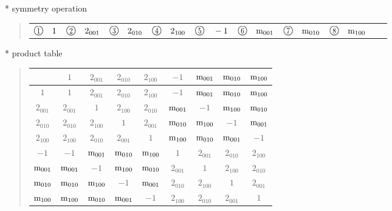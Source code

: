 \documentclass[fleqn,10pt,landscape]{jsarticle}
\begin{document}
* symmetry operation
\begin{quote}
\begin{tabular}{llllllllll}
$ {\ooalign{\hfil\resizebox{.8\width}{\height}{1}\hfil\crcr\raise.1ex\hbox{\large$\bigcirc$}}}\quad 1 $ & $ {\ooalign{\hfil\resizebox{.8\width}{\height}{2}\hfil\crcr\raise.1ex\hbox{\large$\bigcirc$}}}\quad 2{}_{001} $ & $ {\ooalign{\hfil\resizebox{.8\width}{\height}{3}\hfil\crcr\raise.1ex\hbox{\large$\bigcirc$}}}\quad 2{}_{010} $ & $ {\ooalign{\hfil\resizebox{.8\width}{\height}{4}\hfil\crcr\raise.1ex\hbox{\large$\bigcirc$}}}\quad 2{}_{100} $ & $ {\ooalign{\hfil\resizebox{.8\width}{\height}{5}\hfil\crcr\raise.1ex\hbox{\large$\bigcirc$}}}\quad -1 $ & $ {\ooalign{\hfil\resizebox{.8\width}{\height}{6}\hfil\crcr\raise.1ex\hbox{\large$\bigcirc$}}}\quad {\rm m}_{001} $ & $ {\ooalign{\hfil\resizebox{.8\width}{\height}{7}\hfil\crcr\raise.1ex\hbox{\large$\bigcirc$}}}\quad {\rm m}_{010} $ & $ {\ooalign{\hfil\resizebox{.8\width}{\height}{8}\hfil\crcr\raise.1ex\hbox{\large$\bigcirc$}}}\quad {\rm m}_{100} $
\end{tabular}
\end{quote}

* product table
\begin{quote}
\begin{tabular}{ccccccccc} \hline \hline
 & $ 1 $ & $ 2{}_{001} $ & $ 2{}_{010} $ & $ 2{}_{100} $ & $ -1 $ & $ {\rm m}_{001} $ & $ {\rm m}_{010} $ & $ {\rm m}_{100} $ \\ \hline
$ 1 $ & $ 1 $ & $ 2{}_{001} $ & $ 2{}_{010} $ & $ 2{}_{100} $ & $ -1 $ & $ {\rm m}_{001} $ & $ {\rm m}_{010} $ & $ {\rm m}_{100} $ \\
$ 2{}_{001} $ & $ 2{}_{001} $ & $ 1 $ & $ 2{}_{100} $ & $ 2{}_{010} $ & $ {\rm m}_{001} $ & $ -1 $ & $ {\rm m}_{100} $ & $ {\rm m}_{010} $ \\
$ 2{}_{010} $ & $ 2{}_{010} $ & $ 2{}_{100} $ & $ 1 $ & $ 2{}_{001} $ & $ {\rm m}_{010} $ & $ {\rm m}_{100} $ & $ -1 $ & $ {\rm m}_{001} $ \\
$ 2{}_{100} $ & $ 2{}_{100} $ & $ 2{}_{010} $ & $ 2{}_{001} $ & $ 1 $ & $ {\rm m}_{100} $ & $ {\rm m}_{010} $ & $ {\rm m}_{001} $ & $ -1 $ \\
$ -1 $ & $ -1 $ & $ {\rm m}_{001} $ & $ {\rm m}_{010} $ & $ {\rm m}_{100} $ & $ 1 $ & $ 2{}_{001} $ & $ 2{}_{010} $ & $ 2{}_{100} $ \\
$ {\rm m}_{001} $ & $ {\rm m}_{001} $ & $ -1 $ & $ {\rm m}_{100} $ & $ {\rm m}_{010} $ & $ 2{}_{001} $ & $ 1 $ & $ 2{}_{100} $ & $ 2{}_{010} $ \\
$ {\rm m}_{010} $ & $ {\rm m}_{010} $ & $ {\rm m}_{100} $ & $ -1 $ & $ {\rm m}_{001} $ & $ 2{}_{010} $ & $ 2{}_{100} $ & $ 1 $ & $ 2{}_{001} $ \\
$ {\rm m}_{100} $ & $ {\rm m}_{100} $ & $ {\rm m}_{010} $ & $ {\rm m}_{001} $ & $ -1 $ & $ 2{}_{100} $ & $ 2{}_{010} $ & $ 2{}_{001} $ & $ 1 $ \\
 \hline \hline
\end{tabular}
\end{quote}
\end{document}
